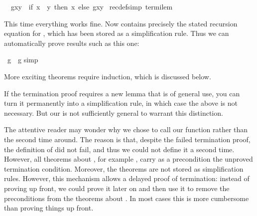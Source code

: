 \begin{isabellebody}
\ \ {\isachardoublequote}g{\isacharparenleft}x{\isacharcomma}y{\isacharparenright}\ {\isacharequal}\ {\isacharparenleft}if\ x\ {\isasymle}\ y\ then\ x\ else\ g{\isacharparenleft}x{\isacharcomma}y{\isacharplus}{}{\isacharparenright}{\isacharparenright}{\isachardoublequote}\isanewline
{\isacharparenleft}\ recdef{\isacharunderscore}simp{\isacharcolon}\ termi{\isacharunderscore}lem{\isacharparenright}\isamarkupfalse%
%
\begin{isamarkuptext}%
\noindent
This time everything works fine. Now  contains precisely
the stated recursion equation for , which has been stored as a
simplification rule.  Thus we can automatically prove results such as this one:%
\end{isamarkuptext}%
\isamarkuptrue%
\ {\isachardoublequote}g{\isacharparenleft}{}{\isacharcomma}{}{\isacharparenright}\ {\isacharequal}\ g{\isacharparenleft}{}{\isacharcomma}{}{\isacharparenright}{\isachardoublequote}\isanewline
\isamarkupfalse%
simp{\isacharparenright}\isanewline
\isamarkupfalse%
\isamarkupfalse%
%
\begin{isamarkuptext}%
\noindent
More exciting theorems require induction, which is discussed below.

If the termination proof requires a new lemma that is of general use, you can
turn it permanently into a simplification rule, in which case the above
 is not necessary. But our  is not
sufficiently general to warrant this distinction.

The attentive reader may wonder why we chose to call our function 
rather than  the second time around. The reason is that, despite
the failed termination proof, the definition of  did not
fail, and thus we could not define it a second time. However, all theorems
about , for example , carry as a precondition
the unproved termination condition. Moreover, the theorems
 are not stored as simplification rules. 
However, this mechanism
allows a delayed proof of termination: instead of proving
 up front, we could prove 
it later on and then use it to remove the preconditions from the theorems
about . In most cases this is more cumbersome than proving things
up front.
%
\end{isamarkuptext}%
\isamarkuptrue%
\isamarkupfalse%
\end{isabellebody}%
